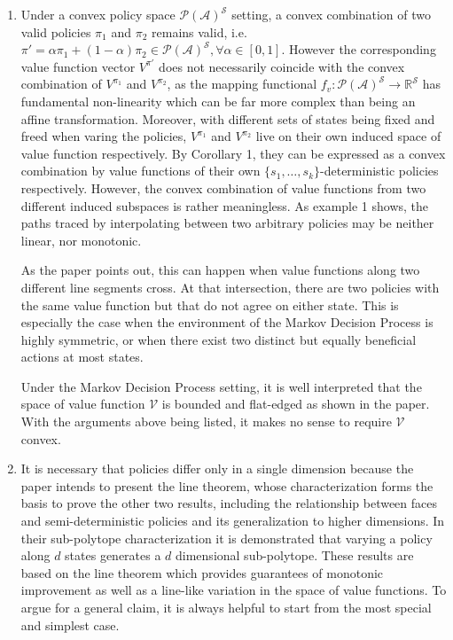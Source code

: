 \begin{Solution}
\begin{enumerate} [label=\alph*)]
        \item
        Under a convex policy space $\mathcal{P}(\mathcal{A})^\mathcal{S}$ setting, a convex combination of two valid policies $\pi_1$ and $\pi_2$ remains valid, i.e. $\pi' = \alpha \pi_1 + (1-\alpha) \pi_2 \in \mathcal{P}(\mathcal{A})^\mathcal{S}, \forall \alpha \in [0, 1]$. However the corresponding value function vector $V^{\pi'}$ does not necessarily coincide with the convex combination of $V^{\pi_1}$ and $V^{\pi_2}$, as the mapping functional $f_v: \mathcal{P}(\mathcal{A})^\mathcal{S} \rightarrow \mathbb{R}^\mathcal{S}$ has fundamental non-linearity which can be far more complex than being an affine transformation. Moreover, with different sets of states being fixed and freed when varing the policies, $V^{\pi_1}$ and $V^{\pi_2}$ live on their own induced space of value function respectively. By Corollary 1, they can be expressed as a convex combination by value functions of their own $\{s_1, \ldots, s_k\}$-deterministic policies respectively. However, the convex combination of value functions from two different induced subspaces is rather meaningless. As example 1 shows, the paths traced by interpolating between two arbitrary policies may be neither linear, nor monotonic. 
        
        As the paper points out, this can happen when value functions along two different line segments cross. At that intersection, there are two policies with the same value function but that do not agree on either state. This is especially the case when the environment of the Markov Decision Process is highly symmetric, or when there exist two distinct but equally beneficial actions at most states. 
        
        Under the Markov Decision Process setting, it is well interpreted that the space of value function $\mathcal{V}$ is bounded and flat-edged as shown in the paper. With the arguments above being listed, it makes no sense to require $\mathcal{V}$ convex. 
        
        \item
        It is necessary that policies differ only in a single dimension because the paper intends to present the line theorem, whose characterization forms the basis to prove the other two results, including the relationship between faces and semi-deterministic policies and its generalization to higher dimensions. In their sub-polytope characterization it is demonstrated that varying a policy along $d$ states generates a $d$ dimensional sub-polytope. These results are based on the line theorem which provides guarantees of monotonic improvement as well as a line-like variation in the space of value functions. To argue for a general claim, it is always helpful to start from the most special and simplest case.
        

\end{enumerate}
\end{Solution}
